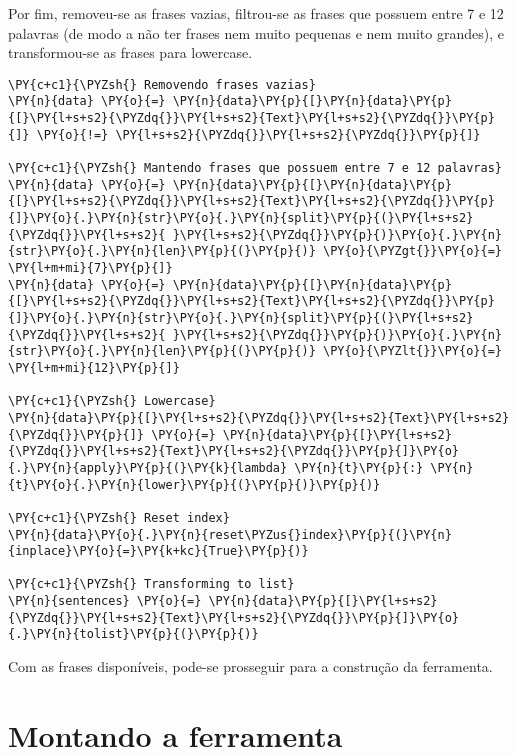 \documentclass[a4paper,11pt,final]{article}
\begin{document}
Por fim, removeu-se as frases vazias, filtrou-se as frases que possuem entre 7 e 12 palavras (de modo a não ter frases nem muito pequenas e nem muito grandes), e transformou-se as frases para lowercase.



\begin{Verbatim}[commandchars=\\\{\},frame=single,fontsize=\small, xleftmargin=0.5em]
\PY{c+c1}{\PYZsh{} Removendo frases vazias}
\PY{n}{data} \PY{o}{=} \PY{n}{data}\PY{p}{[}\PY{n}{data}\PY{p}{[}\PY{l+s+s2}{\PYZdq{}}\PY{l+s+s2}{Text}\PY{l+s+s2}{\PYZdq{}}\PY{p}{]} \PY{o}{!=} \PY{l+s+s2}{\PYZdq{}}\PY{l+s+s2}{\PYZdq{}}\PY{p}{]}

\PY{c+c1}{\PYZsh{} Mantendo frases que possuem entre 7 e 12 palavras}
\PY{n}{data} \PY{o}{=} \PY{n}{data}\PY{p}{[}\PY{n}{data}\PY{p}{[}\PY{l+s+s2}{\PYZdq{}}\PY{l+s+s2}{Text}\PY{l+s+s2}{\PYZdq{}}\PY{p}{]}\PY{o}{.}\PY{n}{str}\PY{o}{.}\PY{n}{split}\PY{p}{(}\PY{l+s+s2}{\PYZdq{}}\PY{l+s+s2}{ }\PY{l+s+s2}{\PYZdq{}}\PY{p}{)}\PY{o}{.}\PY{n}{str}\PY{o}{.}\PY{n}{len}\PY{p}{(}\PY{p}{)} \PY{o}{\PYZgt{}}\PY{o}{=} \PY{l+m+mi}{7}\PY{p}{]}
\PY{n}{data} \PY{o}{=} \PY{n}{data}\PY{p}{[}\PY{n}{data}\PY{p}{[}\PY{l+s+s2}{\PYZdq{}}\PY{l+s+s2}{Text}\PY{l+s+s2}{\PYZdq{}}\PY{p}{]}\PY{o}{.}\PY{n}{str}\PY{o}{.}\PY{n}{split}\PY{p}{(}\PY{l+s+s2}{\PYZdq{}}\PY{l+s+s2}{ }\PY{l+s+s2}{\PYZdq{}}\PY{p}{)}\PY{o}{.}\PY{n}{str}\PY{o}{.}\PY{n}{len}\PY{p}{(}\PY{p}{)} \PY{o}{\PYZlt{}}\PY{o}{=} \PY{l+m+mi}{12}\PY{p}{]}

\PY{c+c1}{\PYZsh{} Lowercase}
\PY{n}{data}\PY{p}{[}\PY{l+s+s2}{\PYZdq{}}\PY{l+s+s2}{Text}\PY{l+s+s2}{\PYZdq{}}\PY{p}{]} \PY{o}{=} \PY{n}{data}\PY{p}{[}\PY{l+s+s2}{\PYZdq{}}\PY{l+s+s2}{Text}\PY{l+s+s2}{\PYZdq{}}\PY{p}{]}\PY{o}{.}\PY{n}{apply}\PY{p}{(}\PY{k}{lambda} \PY{n}{t}\PY{p}{:} \PY{n}{t}\PY{o}{.}\PY{n}{lower}\PY{p}{(}\PY{p}{)}\PY{p}{)}

\PY{c+c1}{\PYZsh{} Reset index}
\PY{n}{data}\PY{o}{.}\PY{n}{reset\PYZus{}index}\PY{p}{(}\PY{n}{inplace}\PY{o}{=}\PY{k+kc}{True}\PY{p}{)}

\PY{c+c1}{\PYZsh{} Transforming to list}
\PY{n}{sentences} \PY{o}{=} \PY{n}{data}\PY{p}{[}\PY{l+s+s2}{\PYZdq{}}\PY{l+s+s2}{Text}\PY{l+s+s2}{\PYZdq{}}\PY{p}{]}\PY{o}{.}\PY{n}{tolist}\PY{p}{(}\PY{p}{)}
\end{Verbatim}


Com as frases disponíveis, pode-se prosseguir para a construção da ferramenta.

\section{Montando a ferramenta}
\end{document}
